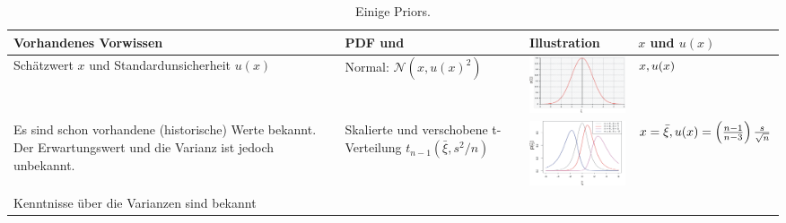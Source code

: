 \begin{table}[!htbp]
	\caption{Einige Priors.}
	\centering
	\begin{tabular}{m{3cm} |m{3cm} m{4.5cm}| m{3cm}}  \hline 
		Vorhandenes Vorwissen & PDF \hspace{1em} und & Illustration & $x$ und $u(x)$\\ 
		\hline \vspace*{2ex}
		Schätzwert $x$ und Standardunsicherheit $u(x)$ \vspace*{4ex} &
		Normal: $\mathcal{N} (x, u(x)^2)$ & 
				\includegraphics[width=40mm]{08_vorlesung/media/Prior_Normalverteilung.png}
	 & $x,\newline u(x)$ \\
	 \hline \vspace*{2ex}
	 Es sind schon vorhandene (historische) Werte bekannt. Der Erwartungswert und die Varianz ist jedoch unbekannt. \vspace*{4ex} &
	 Skalierte und \newline verschobene t-Verteilung $t_{n-1}(\bar \xi, s^2/n)$ & 
	 \includegraphics[width=40mm]{08_vorlesung/media/Prior_Studentverteilung.png}
	 & $x = \bar \xi, \newline u(x) = \left(\frac{n-1}{n-3}\right) \frac{s}{\sqrt{n}}$ \\
	 \hline \vspace*{6ex}
	 Kenntnisse über die Varianzen sind bekannt \vspace*{4ex} &
	

\end{tabular}
\end{table}
